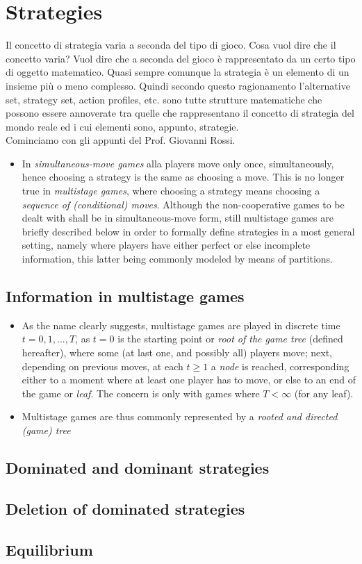 \chapter{Strategies}
Il concetto di strategia varia a seconda del tipo di gioco. Cosa vuol dire che il concetto varia? Vuol dire che a seconda del gioco \`e rappresentato da un certo tipo di oggetto matematico. 
Quasi sempre comunque la strategia \`e un elemento di un insieme pi\`u o meno complesso. Quindi secondo questo ragionamento l'alternative set, strategy set, action profiles, etc. sono tutte strutture matematiche che possono essere annoverate tra quelle che rappresentano il concetto di strategia del mondo reale ed i cui elementi sono, appunto, strategie. \\

Cominciamo con gli appunti del Prof. Giovanni Rossi.

\begin{itemize}
	\item In \emph{simultaneous-move games} alla players move only once, simultaneously, hence choosing a strategy is the same as choosing a move. This is no longer true in \emph{multistage games}, where choosing a strategy means choosing a \emph{sequence of (conditional) moves}. Although the non-cooperative games to be dealt with shall be in simultaneous-move form, still multistage games are briefly described below in order to formally define strategies in a most general setting, namely where players have either perfect or else incomplete information, this latter being commonly modeled by means of partitions.
\end{itemize}

\section{Information in multistage games}
\begin{itemize}
	\item As the name clearly suggests, multistage games are played in discrete time $t = 0, 1, ..., T$, as $t = 0$ is the starting point or \emph{root of the game tree} (defined hereafter), where some (at last one, and possibly all) players move; next, depending on previous moves, at each $t \ge 1$ a \emph{node} is reached, corresponding either to a moment where at least one player has to move, or else to an end of the game or \emph{leaf}. The concern is only with games where $T < \infty$ (for any leaf).
	
	\item Multistage games are thus commonly represented by a \emph{rooted and directed (game) tree} 
\end{itemize}

\section{Dominated and dominant strategies}
\section{Deletion of dominated strategies}
\section{Equilibrium}